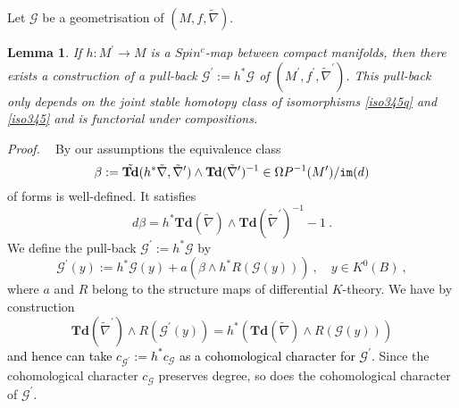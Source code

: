 \documentclass[12pt]{article}
\newtheorem{lem}[theorem]{Lemma}
\newcommand{\im}{{\tt im}}
\newcommand{\cG}{{\mathcal{G}}}
\newcommand{\proof}{{\it Proof.$\:\:\:\:$}}
\newcommand{\Td}{{\mathbf{Td}}}
\begin{document}
 Let  $\cG$ be a geometrisation of 
$(M,f,\tilde \nabla)$.
\begin{lem}\label{lem906} If $h:M^{\prime}\to M$ is a  $Spin^{c}$-map between compact manifolds, then
there exists a  construction of a pull-back $\cG^{\prime}:=h^{*}\cG$  of $(M^{\prime},f^{\prime}, \tilde \nabla^{\prime})$. This pull-back only depends on the joint stable homotopy class of isomorphisms \eqref{iso345q} and \eqref{iso345} and is functorial under compositions.
\end{lem}
\proof
By our assumptions the equivalence class
\begin{equation}\label{eqq4}\beta:=\tilde \Td(h^{*}\tilde \nabla,\tilde \nabla^{\prime})\wedge\Td(\tilde \nabla^{\prime})^{-1}\in \Omega P^{-1}(M^{\prime})/\im(d)\end{equation}
of forms is well-defined.
It  satisfies
\begin{equation}\label{betafix1}d\beta=h^{*}\Td(\tilde \nabla)\wedge\Td(\tilde \nabla^{\prime})^{-1}-1\ .\end{equation}
We define the pull-back $\cG^{\prime}:=h^{*}\cG$ by 
\begin{equation}\label{eq1300}\cG^{\prime}(y):=h^{*}\cG(y)+a(\beta\wedge h^{*}R(\cG(y)))\ ,\quad  y\in K^{0}(B )\ ,\end{equation}
where $a$ and $R$ belong to the structure maps of differential $K$-theory.
We have by construction
$$\Td(\tilde \nabla^{\prime})\wedge R(\cG^{\prime}(y))= h^{*}(\Td(\tilde \nabla)\wedge R(\cG(y)))$$ \textcolor{black}{
and hence can take
$c_{\cG^{\prime}}:=h^{*}c_{\cG}$ as a cohomological character for $\cG^{\prime}$.} 
Since the cohomological character $c_{\cG}$ preserves degree,  so does  the cohomological character of $\cG^{\prime}$.
\end{document}
